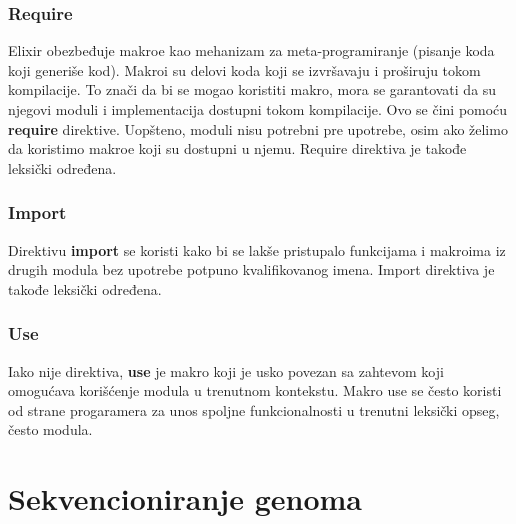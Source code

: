 \documentclass[12pt,oneside]{memoir}
\begin{document}
\subsection{Require}
Elixir obezbeđuje makroe kao mehanizam za meta-programiranje (pisanje koda koji generiše kod). Makroi su delovi koda koji se izvršavaju i proširuju tokom kompilacije. To znači da bi se mogao koristiti makro, mora se garantovati da su njegovi moduli i implementacija dostupni tokom kompilacije. Ovo se čini pomoću \textbf{require} direktive. Uopšteno, moduli nisu potrebni pre upotrebe, osim ako želimo da koristimo makroe koji su dostupni u njemu. Require direktiva je takođe leksički određena.

\subsection{Import}
Direktivu \textbf{import} se koristi kako bi se lakše pristupalo funkcijama i makroima iz drugih modula bez upotrebe potpuno kvalifikovanog imena. Import direktiva je takođe leksički određena. 

\subsection{Use}
Iako nije direktiva, \textbf{use} je makro koji je usko povezan sa zahtevom koji omogućava korišćenje modula u trenutnom kontekstu. Makro use se često koristi od strane progaramera za unos spoljne funkcionalnosti u trenutni leksički opseg, često modula.


\chapter{Sekvencioniranje genoma}
\end{document}
